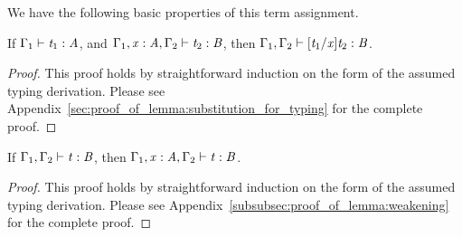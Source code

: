 We have the following basic properties of this term assignment.
\begin{lemma}
  \label{lemma:substitution_for_typing}
  If $\Gamma_{{\mathrm{1}}}  \vdash  \mathit{t_{{\mathrm{1}}}}  :  \mathit{A}$, and $\Gamma_{{\mathrm{1}}}  ,  \mathit{x}  :  \mathit{A}  ,  \Gamma_{{\mathrm{2}}}  \vdash  \mathit{t_{{\mathrm{2}}}}  :  \mathit{B}$, then $\Gamma_{{\mathrm{1}}}  ,  \Gamma_{{\mathrm{2}}}  \vdash  [  \mathit{t_{{\mathrm{1}}}}  /  \mathit{x}  ]  \mathit{t_{{\mathrm{2}}}}  :  \mathit{B}$.
\end{lemma}
\begin{proof}
  This proof holds by straightforward induction on the form of the
  assumed typing derivation.  Please see
  Appendix~\ref{sec:proof_of_lemma:substitution_for_typing} for the
  complete proof.
\end{proof}

\begin{lemma}[Weakening]
  \label{lemma:weakening}
  If $\Gamma_{{\mathrm{1}}}  ,  \Gamma_{{\mathrm{2}}}  \vdash  \mathit{t}  :  \mathit{B}$, then $\Gamma_{{\mathrm{1}}}  ,  \mathit{x}  :  \mathit{A}  ,  \Gamma_{{\mathrm{2}}}  \vdash  \mathit{t}  :  \mathit{B}$.
\end{lemma}
\begin{proof}
  This proof holds by straightforward induction on the form of the
  assumed typing derivation.  Please see
  Appendix~\ref{subsubsec:proof_of_lemma:weakening} for the complete
  proof.
\end{proof}
